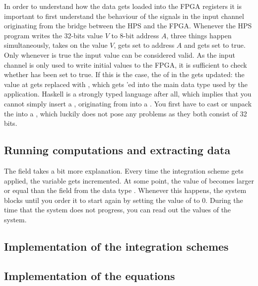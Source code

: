 In order to understand how the data gets loaded into the FPGA registers it is important to first understand the behaviour of the signals in the input channel originating from the bridge between the HPS and the FPGA. Whenever the HPS program writes the 32-bits value $V$ to 8-bit address $A$, three things happen simultaneously,  takes on the value $V$,  gets set to address $A$ and  gets set to true. Only whenever  is true the input value can be considered valid. As the input channel is only used to write initial values to the FPGA, it is sufficient to check whether  has been set to true. If this is the case, the  of  in the  gets updated: the value at  gets replaced with , which gets 'ed into the main data type used by the application. Haskell is a strongly typed language after all, which implies that you cannot simply insert a , originating from  into a . You first have to cast or unpack the  into a , which luckily does not pose any problems as they both consist of 32 bits.



\subsection{Running computations and extracting data}
The  field takes a bit more explanation. Every time the integration scheme gets applied, the  variable gets incremented. At some point, the value of  becomes larger or equal than the  field from the data type . Whenever this happens, the system blocks until you order it to start again by setting the value of  to 0. During the time that the system does not progress, you can read out the values of the system.


\subsection{Implementation of the integration schemes}

\subsection{Implementation of the equations}





